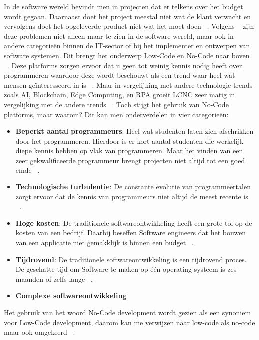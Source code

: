  In de software wereld bevindt men in projecten dat er telkens over het budget wordt gegaan. Daarnaast doet het project meestal niet wat de klant verwacht 
 en vervolgens  doet het opgeleverde product niet wat het moet doen ~\autocite{Moskal_2021}. Volgens ~\textcite{Moskal_2021} zijn deze problemen niet alleen maar te zien in de software wereld, 
 maar ook in andere categorieën binnen de IT-sector of bij het implementer en ontwerpen van software systemen. 
 Dit brengt het onderwerp Low-Code en No-Code naar boven ~\autocite{Kulkarni_2021}. 
 Deze platforms zorgen ervoor dat u geen tot weinig kennis nodig heeft over programmeren waardoor deze wordt beschouwt als een trend waar heel wat mensen geïnteresseerd in is ~\autocite{Kulkarni_2021}.
 Maar in vergelijking met andere technologie trends zoals AI, Blockchain, Edge Computing, en RPA groeit LCNC zeer matig in vergelijking met de andere trends ~\autocite{Kulkarni_2021}.
 Toch stijgt het gebruik van No-Code platforms, maar waarom? Dit kan men onderverdelen in vier categorieën:
\begin{itemize}
  \item \textbf{Beperkt aantal programmeurs}: 
  Heel wat studenten laten zich afschrikken door het programmeren. 
  Hierdoor is er kort aantal studenten die werkelijk diepe kennis hebben op vlak van programmeren. 
  Maar het vinden van een zeer gekwalificeerde programmeur brengt projecten niet altijd tot een goed einde ~\autocite{Moskal_2021}.
  \item \textbf{Technologische turbulentie}: De constante evolutie van programmeertalen zorgt ervoor dat de kennis van programmeurs niet altijd de meest recente is  ~\autocite{Moskal_2021}.
  \item \textbf{Hoge kosten}: De traditionele softwareontwikkeling heeft een grote tol op de kosten van een bedrijf. Daarbij beseffen Software engineers dat het bouwen van een applicatie niet gemakklijk is binnen een budget ~\autocite{Moskal_2021}.
  \item \textbf{Tijdrovend}: De traditionele softwareontwikkeling is een tijdrovend proces. De geschatte tijd om Software te maken op één operating systeem is zes maanden of zelfs lange ~\autocite{Moskal_2021}.
  \item \textbf{Complexe softwareontwikkeling}
\end{itemize} 
Het gebruik van het woord No-Code development wordt gezien als een synoniem voor Low-Code development,
daarom kan me verwijzen naar low-code als no-code maar ook omgekeerd ~\autocite{Rokis_2022}. 

